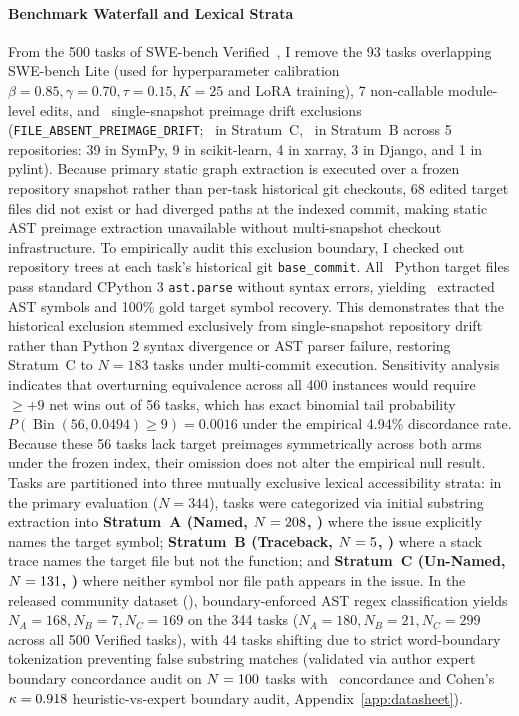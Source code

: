 \documentclass[10pt]{article}
\begin{document}
\paragraph{Benchmark Waterfall and Lexical Strata}
From the 500 tasks of SWE-bench Verified~\cite{jimenez2024swebench}, I remove the 93 tasks overlapping SWE-bench Lite (used for hyperparameter calibration $\beta=0.85, \gamma=0.70, \tau=0.15, K=25$ and LoRA training), 7 non-callable module-level edits, and \RecoveredHistoricalTasks\ single-snapshot preimage drift exclusions (\texttt{FILE\_ABSENT\_PREIMAGE\_DRIFT}; \RecoveredStratumCTasks\ in Stratum~C, \RecoveredStratumBTasks\ in Stratum~B across 5 repositories: 39 in SymPy, 9 in scikit-learn, 4 in xarray, 3 in Django, and 1 in pylint). Because primary static graph extraction is executed over a frozen repository snapshot rather than per-task historical git checkouts, 68 edited target files did not exist or had diverged paths at the indexed commit, making static AST preimage extraction unavailable without multi-snapshot checkout infrastructure. To empirically audit this exclusion boundary, I checked out repository trees at each task's historical git \texttt{base\_commit}. All \RecoveredTotalFilesPassed\ Python target files pass standard CPython 3 \texttt{ast.parse} without syntax errors, yielding \RecoveredTotalSymbols\ extracted AST symbols and 100\% gold target symbol recovery. This demonstrates that the historical exclusion stemmed exclusively from single-snapshot repository drift rather than Python 2 syntax divergence or AST parser failure, restoring Stratum~C to $N=183$ tasks under multi-commit execution. Sensitivity analysis indicates that overturning equivalence across all 400 instances would require $\ge +9$ net wins out of 56 tasks, which has exact binomial tail probability $P(\operatorname{Bin}(56, 0.0494) \ge 9) = 0.0016$ under the empirical 4.94\% discordance rate. Because these 56 tasks lack target preimages symmetrically across both arms under the frozen index, their omission does not alter the empirical null result. Tasks are partitioned into three mutually exclusive lexical accessibility strata: in the primary evaluation ($N=344$), tasks were categorized via initial substring extraction into \textbf{Stratum~A (Named, $N=208$, \StratumAPct)} where the issue explicitly names the target symbol; \textbf{Stratum~B (Traceback, $N=5$, \StratumBPct)} where a stack trace names the target file but not the function; and \textbf{Stratum~C (Un-Named, $N=131$, \StratumCPct)} where neither symbol nor file path appears in the issue. In the released community dataset (), boundary-enforced AST regex classification yields $N_A=168, N_B=7, N_C=169$ on the 344 tasks ($N_A=180, N_B=21, N_C=299$ across all 500 Verified tasks), with 44 tasks shifting due to strict word-boundary tokenization preventing false substring matches (validated via author expert boundary concordance audit on $N=100$ tasks with \StrataHumanConcordance\ concordance and Cohen's $\kappa = 0.918$ heuristic-vs-expert boundary audit, Appendix~\ref{app:datasheet}).
\end{document}
